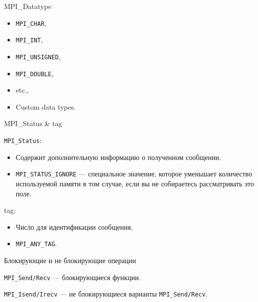 \begin{frame}{MPI_Datatype}

\begin{itemize}
    \item \texttt{MPI_CHAR},
    \item \texttt{MPI_INT},
    \item \texttt{MPI_UNSIGNED},
    \item \texttt{MPI_DOUBLE},
    \item etc.,
    \item Custom data types.
\end{itemize}

\end{frame}

\begin{frame}{MPI_Status \& tag}

\texttt{MPI_Status}:

\begin{itemize}
    \item Содержит дополнительную информацию о полученном сообщении.
    \item \texttt{MPI_STATUS_IGNORE} --- специальное значение, которое уменьшает количество используемой памяти в том случае, если вы не собираетесь рассматривать это поле.
\end{itemize}

\vfill

tag:

\begin{itemize}
    \item Число для идентификации сообщения,
    \item \texttt{MPI_ANY_TAG}.
\end{itemize}

\end{frame}

\begin{frame}{Блокирующие и не блокирующие операции}

\texttt{MPI_Send/Recv} --- блокирующиеся функции.

\begin{figure}
\centering
{}
\end{figure}

\texttt{MPI_Isend/Irecv} --- не блокирующиеся варианты \texttt{MPI_Send/Recv}.

\end{frame}

